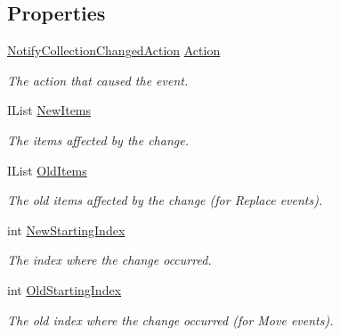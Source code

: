 \subsection*{Properties}
\begin{DoxyCompactItemize}
\item 
\hyperlink{namespace_system_1_1_collections_1_1_specialized_a7e21ea761562ed22011c3120bbb31123}{Notify\+Collection\+Changed\+Action} \hyperlink{class_system_1_1_collections_1_1_specialized_1_1_notify_collection_changed_event_args_ac805867c04d88969bdba0c0905b5486f}{Action}
\begin{DoxyCompactList}\small\item\em The action that caused the event. \end{DoxyCompactList}\item 
I\+List \hyperlink{class_system_1_1_collections_1_1_specialized_1_1_notify_collection_changed_event_args_a457ce8aa87c1088522f53377de25c160}{New\+Items}
\begin{DoxyCompactList}\small\item\em The items affected by the change. \end{DoxyCompactList}\item 
I\+List \hyperlink{class_system_1_1_collections_1_1_specialized_1_1_notify_collection_changed_event_args_addba7c22cf95e7f58444407e0a754932}{Old\+Items}
\begin{DoxyCompactList}\small\item\em The old items affected by the change (for Replace events). \end{DoxyCompactList}\item 
int \hyperlink{class_system_1_1_collections_1_1_specialized_1_1_notify_collection_changed_event_args_a63064da54a35c69e12131b8f3528de25}{New\+Starting\+Index}
\begin{DoxyCompactList}\small\item\em The index where the change occurred. \end{DoxyCompactList}\item 
int \hyperlink{class_system_1_1_collections_1_1_specialized_1_1_notify_collection_changed_event_args_a02c502aab049e59093e5abab2aa587ad}{Old\+Starting\+Index}
\begin{DoxyCompactList}\small\item\em The old index where the change occurred (for Move events). \end{DoxyCompactList}\end{DoxyCompactItemize}


